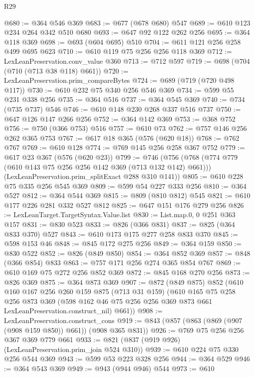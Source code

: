 \begin{lexlean}{R29}
\begin{coremodule}
@680 := @364 @546 @369
@683 := @677 (@678 @680) @547
@689 := @610 @123 @234 @264 @342 @510 @680
@693 := @647 @92 @122 @262 @256
@695 := @364 @118 @369
@698 := @693 (@604 @695) @510
@704 := @611 @121 @256 @258 @499 @695 @623
@710 := @610 @119 @75 @256 @256 @118 @369
@712 := LexLeanPreservation.conv_value @360
@713 := @712 @597
@719 := @698 (@704 (@710 (@713 @38 @118) @661))
@720 := LexLeanPreservation.prim_compareBytes
@724 := @689 (@719 (@720 @498 @117))
@730 := @610 @232 @75 @340 @256 @546 @369
@734 := @599 @55 @231 @338 @256
@735 := @364 @516
@737 := @364 @545 @369
@740 := @734 (@735 @737) @546
@746 := @610 @148 @230 @268 @337 @516 @737
@750 := @647 @126 @147 @266 @256
@752 := @364 @142 @369
@753 := @368 @752
@756 := @750 (@366 @753) @516
@757 := @610 @73
@762 := @757 @146 @256 @262 @365 @753
@767 := @617 @18 @365 (@576 (@620 @18))
@768 := @762 @767
@769 := @610 @128
@774 := @769 @145 @256 @258 @367 @752
@779 := @617 @23 @367 (@576 (@620 @23))
@799 := @746
    (@756
      (@768 (@774 @779 (@610 @143 @75 @256 @256 @142 @369 (@713 @132 @142) @661)))
      (LexLeanPreservation.prim_splitExact @288 @310 @141))
@805 := @610 @228 @75 @335 @256 @545 @369
@809 := @599 @54 @227 @333 @256
@810 := @364 @527
@812 := @364 @544 @369
@815 := @809 (@810 @812) @545
@821 := @610 @177 @226 @281 @332 @527 @812
@825 := @647 @151 @176 @279 @256
@826 := LexLeanTarget.TargetSyntax.Value.list
@830 := List.map.{0, 0} @251 @363 @157
@831 := @830 @523
@833 := @826 (@366 @831)
@837 := @825 (@364 @833 @370) @527
@843 := @610 @173 @175 @277 @258 @833 @370
@845 := @598 @153 @46
@848 := @845 @172 @275 @256
@849 := @364 @159
@850 := @830 @522
@852 := @826 (@849 @850)
@854 := @364 @852 @369
@857 := @848 (@366 @854) @833
@863 := @757 @171 @256 @274 @365 @854 @767
@869 := @610 @169 @75 @272 @256 @852 @369
@872 := @845 @168 @270 @256
@873 := @826 @369
@875 := @364 @873 @369
@907 := @872
    (@849 @875)
    @852
    (@610
      @160
      @167
      @256
      @260
      @159
      @875
      (@713 @31 @159)
      (@610
        @165
        @75
        @258
        @256
        @873
        @369
        (@598 @162 @46 @75 @256 @256 @369 @873 @661 LexLeanPreservation.construct_nil)
        @661))
@908 := LexLeanPreservation.construct_cons
@919 := @843 (@857 (@863 (@869 (@907 (@908 @159 @850)) @661)) (@908 @365 @831))
@926 := @769 @75 @256 @256 @367 @369 @779 @661
@933 := @821 (@837 (@919 @926) (LexLeanPreservation.prim_join @524 @310))
@939 := @610 @224 @75 @330 @256 @544 @369
@943 := @599 @53 @223 @328 @256
@944 := @364 @529
@946 := @364 @543 @369
@949 := @943 (@944 @946) @544
@973 := @610

\end{coremodule}
\end{lexlean}
